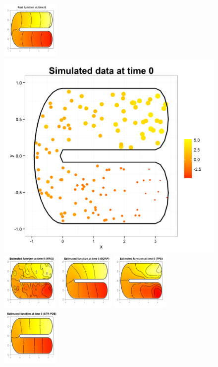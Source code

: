 \documentclass[a4paper,11pt,twoside,openright]{book}							%
\begin{document}
\begin{landscape}
\begin{figure}
\centering
\includegraphics[width=0.25\textwidth]{immagini/simulazioni/REALEtempo1.png}
\includegraphics[height=0.25\textwidth]{immagini/simulazioni/Dati_tempo1.png}
\includegraphics[width=0.25\textwidth]{immagini/simulazioni/KRIGtempo1.png}
\includegraphics[width=0.25\textwidth]{immagini/simulazioni/SOAPtempo1.png}
\includegraphics[width=0.25\textwidth]{immagini/simulazioni/TPStempo1.png}
\includegraphics[width=0.25\textwidth]{immagini/simulazioni/STSRtempo1.png}


\end{figure}
\end{landscape}
\end{document}
